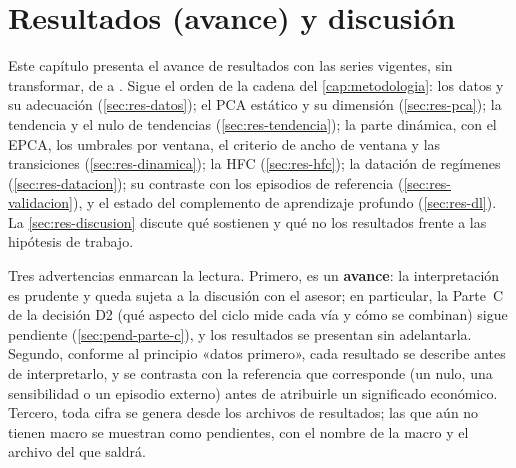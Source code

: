 \chapter{Resultados (avance) y discusión}
\label{cap:resultados}

Este capítulo presenta el avance de resultados con las \nSeries{} series vigentes, sin
transformar, de \fechaInicioNiveles{} a \fechaFinDatos{}. Sigue el orden de la cadena del
\cref{cap:metodologia}: los datos y su adecuación (\cref{sec:res-datos}); el PCA estático y su
dimensión (\cref{sec:res-pca}); la tendencia y el nulo de tendencias (\cref{sec:res-tendencia});
la parte dinámica, con el EPCA, los umbrales por ventana, el criterio de ancho de ventana y las
transiciones (\cref{sec:res-dinamica}); la HFC (\cref{sec:res-hfc}); la datación de regímenes
(\cref{sec:res-datacion}); su contraste con los episodios de referencia
(\cref{sec:res-validacion}), y el estado del complemento de aprendizaje profundo
(\cref{sec:res-dl}). La \cref{sec:res-discusion} discute qué sostienen y qué no los resultados
frente a las hipótesis de trabajo.

Tres advertencias enmarcan la lectura. Primero, es un \textbf{avance}: la interpretación es
prudente y queda sujeta a la discusión con el asesor; en particular, la Parte~C de la decisión D2
(qué aspecto del ciclo mide cada vía y cómo se combinan) sigue pendiente
(\cref{sec:pend-parte-c}), y los resultados se presentan sin adelantarla. Segundo, conforme al
principio «datos primero», cada resultado se describe antes de interpretarlo, y se contrasta con
la referencia que corresponde (un nulo, una sensibilidad o un episodio externo) antes de
atribuirle un significado económico. Tercero, toda cifra se genera desde los archivos de
resultados; las que aún no tienen macro se muestran como pendientes, con el nombre de la macro y
el archivo del que saldrá.

